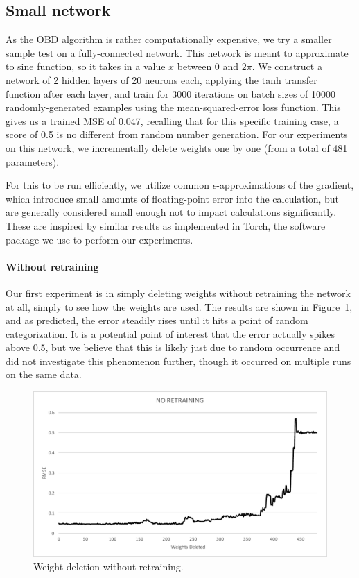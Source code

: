 \documentclass[10pt,twocolumn,letterpaper]{article}
\begin{document}
\subsection{Small network}
As the OBD algorithm is rather computationally expensive, we try a smaller sample test on a fully-connected network.
This network is meant to approximate to sine function, so it takes in a value $x$ between 0 and $2\pi$.
We construct a network of 2 hidden layers of 20 neurons each, applying the tanh transfer function after each layer, and train for 3000 iterations on batch sizes of 10000 randomly-generated examples using the mean-squared-error loss function.
This gives us a trained MSE of 0.047, recalling that for this specific training case, a score of 0.5 is no different from random number generation.
For our experiments on this network, we incrementally delete weights one by one (from a total of 481 parameters).

For this to be run efficiently, we utilize common $\epsilon$-approximations of the gradient, which introduce small amounts of floating-point error into the calculation, but are generally considered small enough not to impact calculations significantly.
These are inspired by similar results as implemented in Torch, the software package we use to perform our experiments.

\paragraph{Without retraining} Our first experiment is in simply deleting weights without retraining the network at all, simply to see how the weights are used.
The results are shown in Figure~\ref{fig:sin-no}, and as predicted, the error steadily rises until it hits a point of random categorization.
It is a potential point of interest that the error actually spikes above 0.5, but we believe that this is likely just due to random occurrence and did not investigate this phenomenon further, though it occurred on multiple runs on the same data.

\begin{figure}[h]
  \centering
  \includegraphics[width=\linewidth]{sin-no-retraining.pdf}
  \caption{Weight deletion without retraining.}
  \label{fig:sin-no}
\end{figure}
\end{document}
